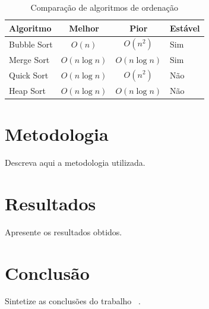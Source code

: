 \documentclass[techreport]{uftreport}
\begin{document}
\begin{table}[ht]
\centering
\caption{Comparação de algoritmos de ordenação}
\begin{tabular}{lccl}
\toprule
\textbf{Algoritmo} & \textbf{Melhor} & \textbf{Pior} & \textbf{Estável} \\
\midrule
Bubble Sort   & $O(n)$       & $O(n^2)$      & Sim \\
Merge Sort    & $O(n\log n)$ & $O(n\log n)$  & Sim \\
Quick Sort    & $O(n\log n)$ & $O(n^2)$      & Não \\
Heap Sort     & $O(n\log n)$ & $O(n\log n)$  & Não \\
\bottomrule
\end{tabular}
\label{tab:algoritmos}
\end{table}

\chapter{Metodologia}

Descreva aqui a metodologia utilizada.

\chapter{Resultados}

Apresente os resultados obtidos.

\chapter{Conclusão}

Sintetize as conclusões do trabalho ~\cite{cormen2022}.

\backmatter



\end{document}
